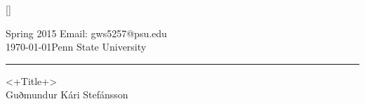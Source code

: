 \documentclass[12pt,a4paper]{article}
\begin{document}
%


\titleformat{\section}{\LARGE\scshape\bfseries\raggedright}{}{0em}{}[\titlerule]
\fancyhf{}
\pagestyle{fancy}


 Spring 2015 \hfill Email: gws5257@psu.edu\\
\today \hfill Penn State University
\rule[8pt]{\textwidth}{1pt}
\begin{center}
	\LARGE{<+Title+>} \\
	\vspace{0.4cm}
	\large{Guðmundur Kári Stefánsson}
\end{center}


%
\end{document}
